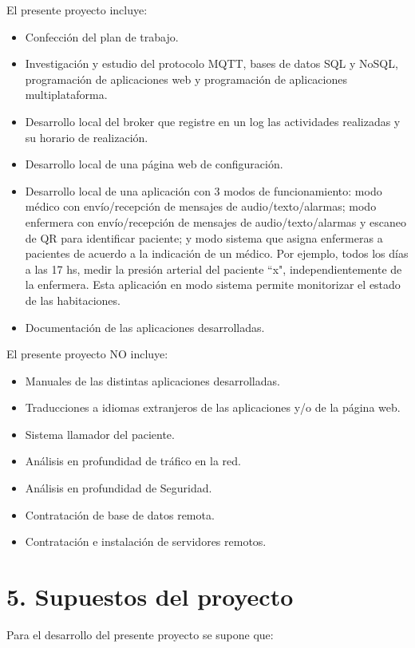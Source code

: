 \documentclass[
11pt, %
]{charter}
\begin{document}
El presente proyecto incluye:

\begin{itemize}
	\item Confección del plan de trabajo. 
	\item Investigación y estudio del protocolo MQTT, bases de datos SQL y NoSQL, programación de aplicaciones web y programación de aplicaciones multiplataforma.	
	\item Desarrollo local del broker que registre en un log las actividades realizadas y su horario de realización. 
	\item Desarrollo local de una página web de configuración.
	\item Desarrollo local de una aplicación con 3 modos de funcionamiento: modo médico con envío/recepción de mensajes de audio/texto/alarmas; modo enfermera con envío/recepción de mensajes de audio/texto/alarmas y escaneo de QR para identificar paciente; y modo sistema que asigna enfermeras a pacientes de acuerdo a la indicación de un médico. Por ejemplo, todos los días a las 17 hs, medir la presión arterial del paciente ``x", independientemente de la enfermera. Esta aplicación en modo sistema permite monitorizar el estado de las habitaciones.
	\item Documentación de las aplicaciones desarrolladas.

\end{itemize}

El presente proyecto NO incluye:
\begin{itemize}
	\item Manuales de las distintas aplicaciones desarrolladas.
	\item Traducciones a idiomas extranjeros de las aplicaciones y/o de la página web.
	\item Sistema llamador del paciente.
	\item Análisis en profundidad de tráfico en la red.
	\item Análisis en profundidad de Seguridad.
	\item Contratación de base de datos remota.
	\item Contratación e instalación de servidores remotos.
\end{itemize}



\section{5. Supuestos del proyecto}
\label{sec:supuestos}
Para el desarrollo del presente proyecto se supone que: 
\end{document}
